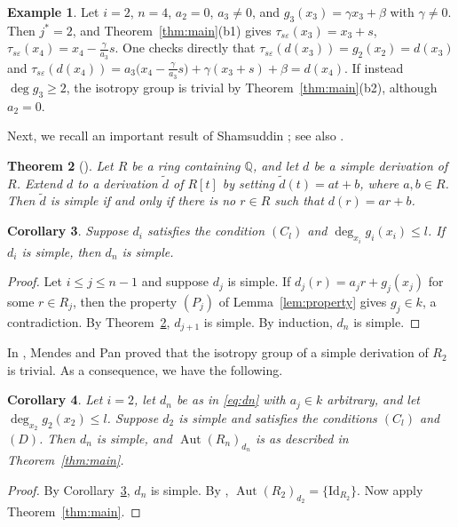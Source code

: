 \documentclass[11pt]{amsart}
\newtheorem{theorem}{Theorem}[section]
\newtheorem{corollary}[theorem]{Corollary}
\theoremstyle{definition}
\newtheorem{example}[theorem]{Example}
\theoremstyle{remark}
\numberwithin{equation}{theorem}
\newcommand{\Aut}{\operatorname{Aut}}
\newcommand{\id}{\mathrm{Id}}
\begin{document}
\begin{example}
Let $i=2$, $n=4$, $a_2=0$, $a_3\neq0$, and $g_3(x_3)=\gamma x_3+\beta$ with $\gamma\neq0$. Then $j^*=2$,
and Theorem~\ref{thm:main}(b1) gives $\tau_{s\varepsilon}(x_3)=x_3+s$, $\tau_{s\varepsilon}(x_4)=x_4-\frac{\gamma}{a_3}s$. One checks
directly that $\tau_{s\varepsilon}(d(x_3))=g_2(x_2)=d(x_3)$ and
$\tau_{s\varepsilon}(d(x_4))=a_3\bigl(x_4-\tfrac{\gamma}{a_3}s\bigr)+\gamma(x_3+s)+\beta=d(x_4)$. If instead
$\deg g_3\ge2$, the isotropy group is trivial by Theorem~\ref{thm:main}(b2), although $a_2=0$.
\end{example}

Next, we recall an important result of Shamsuddin \cite{Sha77}; see also \cite[Theorem~13.2.1]{Now94}.

\begin{theorem}[\cite{Sha77}]\label{thm:sham}
Let $R$ be a ring containing $\mathbb{Q}$, and let $d$ be a simple derivation of $R$. Extend $d$ to a
derivation $\tilde d$ of $R[t]$ by setting $\tilde d(t)=at+b$, where $a,b\in R$. Then $\tilde d$ is simple
if and only if there is no $r\in R$ such that $d(r)=ar+b$.
\end{theorem}

\begin{corollary}\label{cor:simple}
Suppose $d_i$ satisfies the condition $(C_l)$ and $\deg_{x_i}g_i(x_i)\le l$. If $d_i$ is simple, then $d_n$ is simple.
\end{corollary}

\begin{proof}
Let $i\le j\le n-1$ and suppose $d_j$ is simple. If $d_j(r)=a_jr+g_j(x_j)$ for some $r\in R_j$, then
the property $(P_j)$ of Lemma~\ref{lem:property} gives $g_j\in k$, a contradiction. By
Theorem~\ref{thm:sham}, $d_{j+1}$ is simple. By induction, $d_n$ is simple.
\end{proof}

In \cite{MP17}, Mendes and Pan proved that the isotropy group of a simple derivation of $R_2$ is
trivial. As a consequence, we have the following.

\begin{corollary}\label{cor:i2}
Let $i=2$, let $d_n$ be as in \eqref{eq:dn} with $a_j\in k$ arbitrary, and let
$\deg_{x_2}g_2(x_2)\le l$. Suppose $d_2$ is simple and satisfies the conditions $(C_l)$ and $(D)$. Then $d_n$ is simple,
and $\Aut(R_n)_{d_n}$ is as described in Theorem~\ref{thm:main}.
\end{corollary}

\begin{proof}
By Corollary~\ref{cor:simple}, $d_n$ is simple. By \cite[Theorem~1]{MP17}, $\Aut(R_2)_{d_2}=\{\id_{R_2}\}$.
Now apply Theorem~\ref{thm:main}.
\end{proof}
\end{document}
